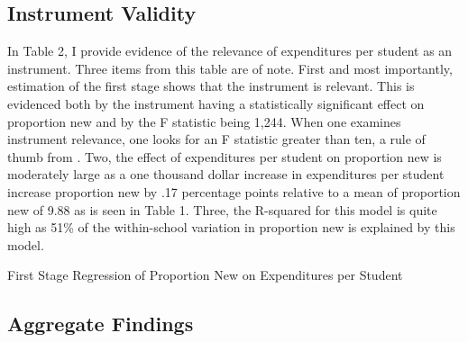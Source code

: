 \documentclass[12pt]{report}
\begin{document}
\subsection{Instrument Validity}
\noindent In Table 2, I provide evidence of the relevance of expenditures per student as an instrument. Three items from this table are of note. First and most importantly, estimation of the first stage shows that the instrument is relevant. This is evidenced both by the instrument having a statistically significant effect on proportion new and by the F statistic being 1,244. When one examines instrument relevance, one looks for an F statistic greater than ten, a rule of thumb from \cite{yogo}. Two, the effect of expenditures per student on proportion new is moderately large as a one thousand dollar increase in expenditures per student increase proportion new by .17 percentage points relative to a mean of proportion new of 9.88 as is seen in Table 1. Three, the R-squared for this model is quite high as 51\% of the within-school variation in proportion new is explained by this model.

\begin{table}[!htb]
\caption{First Stage Regression of Proportion New on Expenditures per Student}
    \centering

\end{table}
\newpage
\subsection{Aggregate Findings}
\end{document}
